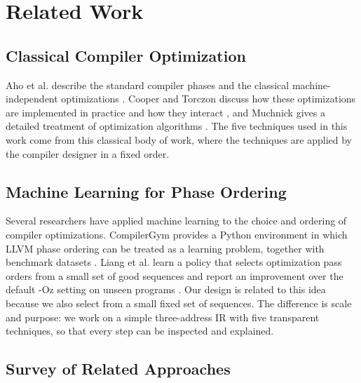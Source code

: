 \documentclass[12pt,a4paper]{article}
\begin{document}
\newpage

\section{Related Work}


\subsection{Classical Compiler Optimization}

Aho et al. describe the standard compiler phases and the classical machine-independent optimizations \cite{aho2006}. Cooper and Torczon discuss how these optimizations are implemented in practice and how they interact \cite{cooper2007}, and Muchnick gives a detailed treatment of optimization algorithms \cite{muchnick1997}. The five techniques used in this work come from this classical body of work, where the techniques are applied by the compiler designer in a fixed order.

\subsection{Machine Learning for Phase Ordering}

Several researchers have applied machine learning to the choice and ordering of compiler optimizations. CompilerGym provides a Python environment in which LLVM phase ordering can be treated as a learning problem, together with benchmark datasets \cite{cummins2021}. Liang et al. learn a policy that selects optimization pass orders from a small set of good sequences and report an improvement over the default -Oz setting on unseen programs \cite{liang2023}. Our design is related to this idea because we also select from a small fixed set of sequences. The difference is scale and purpose: we work on a simple three-address IR with five transparent techniques, so that every step can be inspected and explained.

\subsection{Survey of Related Approaches}
\end{document}

